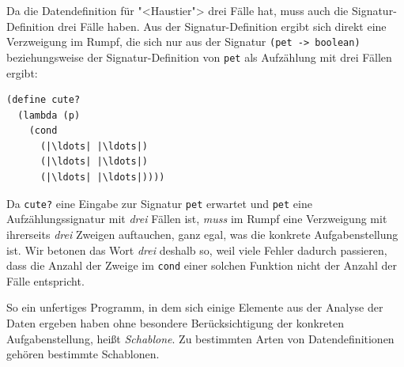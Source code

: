 Da die Datendefinition für "<Haustier"> drei Fälle hat, muss auch die
Signatur-Definition drei Fälle haben.  Aus der Signatur-Definition
ergibt sich direkt eine Verzweigung im Rumpf, die sich nur aus der
Signatur \lstinline{(pet -> boolean)} beziehungsweise der
Signatur-Definition von \lstinline{pet} als Aufzählung mit drei Fällen
ergibt:
%
\begin{lstlisting}
(define cute?
  (lambda (p)
    (cond
      (|\ldots| |\ldots|)
      (|\ldots| |\ldots|)
      (|\ldots| |\ldots|))))
\end{lstlisting}
%
Da \lstinline{cute?} eine Eingabe zur Signatur \lstinline{pet} erwartet und
\lstinline{pet} eine Aufzählungssignatur mit \emph{drei} Fällen ist, \emph{muss}
im Rumpf eine Verzweigung mit ihrerseits \emph{drei} Zweigen
auftauchen, ganz egal, was die konkrete Aufgabenstellung ist.  Wir
betonen das Wort \emph{drei} deshalb so, weil viele Fehler dadurch
passieren, dass die Anzahl der Zweige im \lstinline{cond} einer solchen
Funktion nicht der Anzahl der Fälle entspricht.

So ein unfertiges Programm, in dem sich einige Elemente aus der
Analyse der Daten ergeben haben ohne besondere Berücksichtigung der
konkreten Aufgabenstellung, heißt \textit{Schablone}.  Zu bestimmten
Arten von Datendefinitionen gehören bestimmte Schablonen.

